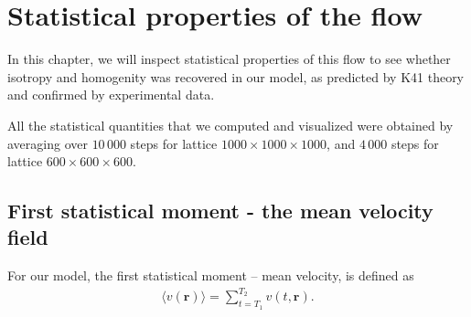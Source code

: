 
\section{Statistical properties of the flow}

%

In this chapter, we will inspect statistical properties of this flow to see whether isotropy and homogenity was recovered in our model, as predicted by K41 theory and confirmed by experimental data.

All the statistical quantities that we computed and visualized were obtained by averaging over $10\,000$ steps for lattice $1000\times 1000\times 1000$, and $4\,000$ steps for lattice $600 \times 600 \times 600$.

\subsection{First statistical moment - the mean velocity field}
For our model, the first statistical moment -- mean velocity, is defined as
\begin{align}\label{fsmm}
\langle v(\bm{r}) \rangle = \sum_{t = T_1}^{T_2} v(t,\bm{r}).
\end{align}

